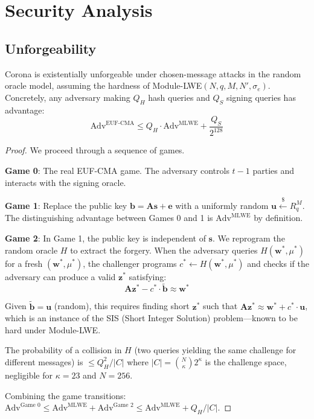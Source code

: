 \section{Security Analysis}

\label{sec:security}

\subsection{Unforgeability}

\begin{theorem}
\label{thm:euf-cma}
Corona is existentially unforgeable under chosen-message attacks in the random oracle
model, assuming the hardness of Module-LWE$(N, q, M, N', \sigma_e)$. Concretely, any
adversary making $Q_H$ hash queries and $Q_S$ signing queries has advantage:
\[
\text{Adv}^{\text{EUF-CMA}} \leq Q_H \cdot \text{Adv}^{\text{MLWE}} + \frac{Q_S}{2^{128}}
\]
\end{theorem}

\begin{proof}
We proceed through a sequence of games.

\textbf{Game 0}: The real EUF-CMA game. The adversary controls $t-1$ parties and
interacts with the signing oracle.

\textbf{Game 1}: Replace the public key $\mathbf{b} = \mathbf{A}\mathbf{s} + \mathbf{e}$
with a uniformly random $\mathbf{u} \stackrel{\$}{\leftarrow} R_q^M$. The distinguishing
advantage between Games 0 and 1 is $\text{Adv}^{\text{MLWE}}$ by definition.

\textbf{Game 2}: In Game 1, the public key is independent of $\mathbf{s}$. We reprogram
the random oracle $H$ to extract the forgery. When the adversary queries $H(\mathbf{w}^*, \mu^*)$
for a fresh $(\mathbf{w}^*, \mu^*)$, the challenger programs $c^* \gets H(\mathbf{w}^*, \mu^*)$ and
checks if the adversary can produce a valid $\mathbf{z}^*$ satisfying:
\[
\mathbf{A}\mathbf{z}^* - c^* \cdot \tilde{\mathbf{b}} \approx \mathbf{w}^*
\]

Given $\tilde{\mathbf{b}} = \mathbf{u}$ (random), this requires finding short $\mathbf{z}^*$
such that $\mathbf{A}\mathbf{z}^* \approx \mathbf{w}^* + c^* \cdot \mathbf{u}$, which
is an instance of the SIS (Short Integer Solution) problem---known to be hard under
Module-LWE.

The probability of a collision in $H$ (two queries yielding the same challenge for
different messages) is $\leq Q_H^2 / |C|$ where $|C| = \binom{N}{\kappa} 2^\kappa$
is the challenge space, negligible for $\kappa = 23$ and $N = 256$.

Combining the game transitions:
$\text{Adv}^{\text{Game 0}} \leq \text{Adv}^{\text{MLWE}} + \text{Adv}^{\text{Game 2}} \leq \text{Adv}^{\text{MLWE}} + Q_H / |C|$.
\end{proof}

